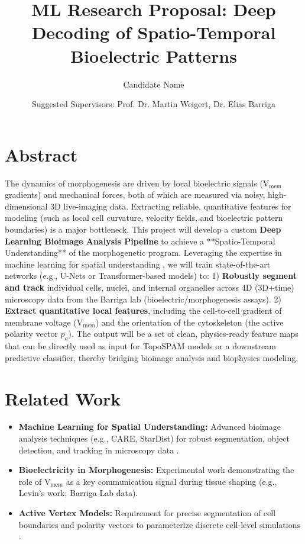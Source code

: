 \documentclass{article}
\title{ML Research Proposal: Deep Decoding of Spatio-Temporal Bioelectric Patterns}
\author{Candidate Name}
\date{Suggested Supervisors: Prof. Dr. Martin Weigert, Dr. Elias Barriga}
\begin{document}
\maketitle

\section*{Abstract}
The dynamics of morphogenesis are driven by local bioelectric signals ($\text{V}_{\text{mem}}$ gradients) and mechanical forces, both of which are measured via noisy, high-dimensional 3D live-imaging data. Extracting reliable, quantitative features for modeling (such as local cell curvature, velocity fields, and bioelectric pattern boundaries) is a major bottleneck. This project will develop a custom \textbf{Deep Learning Bioimage Analysis Pipeline} to achieve a **Spatio-Temporal Understanding** of the morphogenetic program. Leveraging the expertise in machine learning for spatial understanding \cite{4, 6}, we will train state-of-the-art networks (e.g., U-Nets or Transformer-based models) to: 1) \textbf{Robustly segment and track} individual cells, nuclei, and internal organelles across 4D (3D+time) microscopy data from the Barriga lab (bioelectric/morphogenesis assays). 2) \textbf{Extract quantitative local features}, including the cell-to-cell gradient of membrane voltage ($\text{V}_{\text{mem}}$) and the orientation of the cytoskeleton (the active polarity vector $p_a$). The output will be a set of clean, physics-ready feature maps that can be directly used as input for TopoSPAM models or a downstream predictive classifier, thereby bridging bioimage analysis and biophysics modeling.

\section*{Related Work}
\begin{itemize}
    \item \textbf{Machine Learning for Spatial Understanding:} Advanced bioimage analysis techniques (e.g., CARE, StarDist) for robust segmentation, object detection, and tracking in microscopy data \cite{4, 6}.
    \item \textbf{Bioelectricity in Morphogenesis:} Experimental work demonstrating the role of $\text{V}_{\text{mem}}$ as a key communication signal during tissue shaping (e.g., Levin's work; Barriga Lab data).
    \item \textbf{Active Vertex Models:} Requirement for precise segmentation of cell boundaries and polarity vectors to parameterize discrete cell-level simulations \cite{1}.
\end{itemize}
\end{document}
